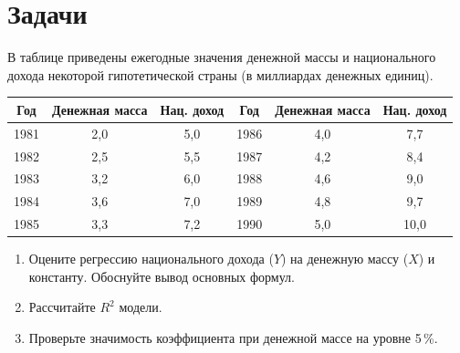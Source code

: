 \ifsolutions\clearpage\fi
\section{Задачи}


В таблице приведены ежегодные значения денежной массы и национального дохода
некоторой гипотетической страны (в миллиардах денежных единиц).

\begin{center}
\begin{tabular}{ccc @{\qquad} ccc}
\toprule
Год & Денежная масса & Нац. доход & Год & Денежная масса & Нац. доход \\
\midrule
1981 & 2,0 & 5,0 & 1986 & 4,0 & 7,7 \\
1982 & 2,5 & 5,5 & 1987 & 4,2 & 8,4 \\
1983 & 3,2 & 6,0 & 1988 & 4,6 & 9,0 \\
1984 & 3,6 & 7,0 & 1989 & 4,8 & 9,7 \\
1985 & 3,3 & 7,2 & 1990 & 5,0 & 10,0 \\
\bottomrule
\end{tabular}
\end{center}

\begin{enumerate}[label=\asbuk*), leftmargin=2.2em, itemsep=3pt]
  \item Оцените регрессию национального дохода ($Y$) на денежную массу ($X$)
        и константу. Обоснуйте вывод основных формул.
  \item Рассчитайте $R^2$ модели.
  \item Проверьте значимость коэффициента при денежной массе на уровне 5\,\%.
\end{enumerate}

